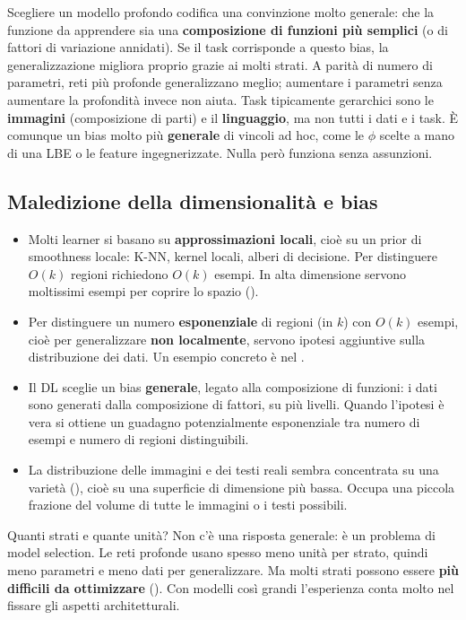 Scegliere un modello profondo codifica una convinzione molto generale: che la funzione da apprendere sia una
\textbf{composizione di funzioni più semplici} (o di fattori di variazione annidati). Se il task corrisponde a
questo bias, la generalizzazione migliora proprio grazie ai molti strati. A parità di numero di parametri, reti più
profonde generalizzano meglio; aumentare i parametri senza aumentare la profondità invece non aiuta. Task
tipicamente gerarchici sono le \textbf{immagini} (composizione di parti) e il \textbf{linguaggio}, ma non tutti i
dati e i task. È comunque un bias molto più \textbf{generale} di vincoli ad hoc, come le $\phi$ scelte a mano di
una LBE o le feature ingegnerizzate. Nulla però funziona senza assunzioni.

\subsection{Maledizione della dimensionalità e bias}

\begin{itemize}
  \item Molti learner si basano su \textbf{approssimazioni locali}, cioè su un prior di smoothness locale: K-NN,
        kernel locali, alberi di decisione. Per distinguere $O(k)$ regioni richiedono $O(k)$ esempi. In alta
        dimensione servono moltissimi esempi per coprire lo spazio ().
  \item Per distinguere un numero \textbf{esponenziale} di regioni (in $k$) con $O(k)$ esempi, cioè per
        generalizzare \textbf{non localmente}, servono ipotesi aggiuntive sulla distribuzione dei dati. Un esempio
        concreto è nel .
  \item Il DL sceglie un bias \textbf{generale}, legato alla composizione di funzioni: i dati sono generati dalla
        composizione di fattori, su più livelli. Quando l'ipotesi è vera si ottiene un guadagno potenzialmente
        esponenziale tra numero di esempi e numero di regioni distinguibili.
  \item La distribuzione delle immagini e dei testi reali sembra concentrata su una varietà (), cioè
        su una superficie di dimensione più bassa. Occupa una piccola frazione del volume di tutte le immagini o i
        testi possibili.
\end{itemize}

Quanti strati e quante unità? Non c'è una risposta generale: è un problema di model selection. Le reti profonde
usano spesso meno unità per strato, quindi meno parametri e meno dati per generalizzare. Ma molti strati possono
essere \textbf{più difficili da ottimizzare} (). Con modelli così grandi l'esperienza conta
molto nel fissare gli aspetti architetturali.

